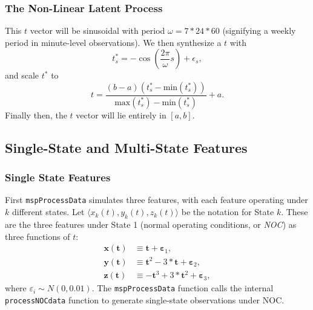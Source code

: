 \documentclass{report}\usepackage[]{graphicx}\usepackage[]{color}
\begin{document}
\subsubsection{The Non-Linear Latent Process}
This $t$ vector will be sinusoidal with period $\omega = 7 * 24 * 60$ (signifying a weekly period in  minute-level observations). We then synthesize a $t$ with
\[
  t^*_s = -\cos\left( \frac{2\pi}{\omega} s \right) + \epsilon_s,
\]
and scale $t^*$ to
\[
  t = \frac{(b - a)(t^*_s - \text{min}(t^*_s))}{\text{max}(t^*_s) - \text{min}(t^*_s)} + a.
\]
Finally then, the $t$ vector will lie entirely in $[a,b]$.


\subsection{Single-State and Multi-State Features}

\subsubsection{Single State Features}
First \texttt{mspProcessData} simulates three features, with each feature operating under $k$ different states. Let $\langle x_k(t), y_k(t), z_k(t) \rangle$ be the notation for State $k$. These are the three features under State 1 (normal operating conditions, or \emph{NOC}) as three functions of $t$:
\begin{align}
\textbf{x}(\textbf{t}) &\equiv \textbf{t} + \boldsymbol\varepsilon_1, \\
\textbf{y}(\textbf{t}) &\equiv \textbf{t} ^ 2 - 3 * \textbf{t} + \boldsymbol\varepsilon_2, \\
\textbf{z}(\textbf{t}) &\equiv -\textbf{t} ^ 3 + 3 * \textbf{t} ^ 2 + \boldsymbol\varepsilon_3,
\end{align}
where $\varepsilon_i \sim N(0, 0.01)$. The \texttt{mspProcessData} function calls the internal \texttt{processNOCdata} function to generate single-state observations under NOC.
\end{document}
